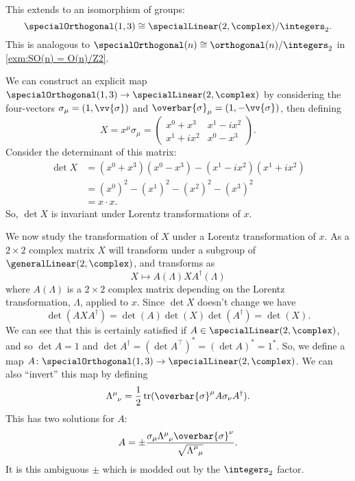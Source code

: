 \documentclass[fleqn]{NotesClass}
\newcommand{\cyclicGroupZ}[1][n]{\integers_{#1}}
\newcommand{\isomorphic}{\cong}
\newcommand{\hermit}{\dagger}
\newcommand{\trans}{\top}
\DeclareMathOperator{\tr}{tr}
\begin{document}
    This extends to an isomorphism of groups:
    \begin{equation}
        \specialOrthogonal(1, 3) \isomorphic \specialLinear(2, \complex) / \cyclicGroupZ[2].
    \end{equation}
    This is analogous to \(\specialOrthogonal(n) \isomorphic \orthogonal(n)/\cyclicGroupZ[2]\) in \cref{exm:SO(n) = O(n)/Z2}.
    
    We can construct an explicit map \(\specialOrthogonal(1, 3) \to \specialLinear(2, \complex)\) by considering the four-vectors \(\sigma_\mu = (1, \vv{\sigma})\) and \(\overbar{\sigma}_\mu = (1, -\vv{\sigma})\), then defining
    \begin{equation}
        X = x^\mu \sigma_\mu = 
        \begin{pmatrix}
            x^0 + x^3 & x^1 - ix^2\\
            x^1 + ix^2 & x^0 - x^3
        \end{pmatrix}
        .
    \end{equation}
    Consider the determinant of this matrix:
    \begin{align}
        \det X &= (x^0 + x^3)(x^0 - x^3) - (x^1 - ix^2)(x^1 + ix^2)\\
        &= (x^0)^2 - (x^1)^2 - (x^2)^2 - (x^3)^2\\
        &= x \cdot x.
    \end{align}
    So, \(\det X\) is invariant under Lorentz transformations of \(x\).
    
    We now study the transformation of \(X\) under a Lorentz transformation of \(x\).
    As a \(2 \times 2\) complex matrix \(X\) will transform under a subgroup of \(\generalLinear(2, \complex)\), and transforms as
    \begin{equation}
        X \mapsto A(\Lambda) X A^\hermit(\Lambda)
    \end{equation}
    where \(A(\Lambda)\) is a \(2 \times 2\) complex matrix depending on the Lorentz transformation, \(\Lambda\), applied to \(x\).
    Since \(\det X\) doesn't change we have
    \begin{equation}
        \det(AXA^\hermit) = \det(A)\det(X)\det(A^\hermit) = \det(X).
    \end{equation}
    We can see that this is certainly satisfied if \(A \in \specialLinear(2, \complex)\), and so \(\det A = 1\) and \(\det A^\hermit = (\det A^\trans)^* = (\det A)^* = 1^*\).
    So, we define a map \(A \colon \specialOrthogonal(1, 3) \to \specialLinear(2, \complex)\).
    We can also \enquote{invert} this map by defining
    \begin{equation}
        \tensor{\Lambda}{^\mu_\nu} = \frac{1}{2} \tr(\overbar{\sigma}^\mu A \sigma_\nu A^\hermit).
    \end{equation}
    This has two solutions for \(A\):
    \begin{equation}
        A = \pm \frac{\sigma_\mu \tensor{\Lambda}{^\mu_\nu}\overbar{\sigma}^\nu}{\sqrt{\tensor{\Lambda}{^\mu_\mu}}}.
    \end{equation}
    It is this ambiguous \(\pm\) which is modded out by the \(\cyclicGroupZ[2]\) factor.
    
    \backmatter
    \printindex
\end{document}
